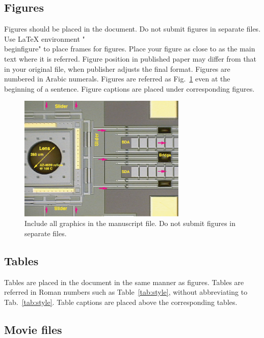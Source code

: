 \documentclass{elex}
\begin{document}
\subsection{Figures}

Figures should be placed in the document.  Do not submit figures in separate files.  Use LaTeX environment "\\begin{figure}" to place frames for figures. Place your figure as close to as the main text where it is referred.  Figure position in published paper may differ from that in your original file, when publisher adjusts the final format. Figures are numbered in Arabic numerals. Figures are referred as Fig.~\ref{fig:scanner} even at the beginning of a sentence. Figure captions are placed under corresponding figures.


\begin{figure}[htb]
\begin{center}
\includegraphics[width=8cm]{figures/lens_scanner.eps}
\end{center}
\caption{Include all graphics in the manuscript file.  Do not submit figures in
separate files.}
\label{fig:scanner}
\end{figure}



\subsection{Tables}

Tables are placed in the document in the same manner as figures.  Tables are referred in Roman numbers such as Table~\ref{tab:style}, without abbreviating to Tab.~\ref{tab:style}.  Table captions are placed above the corresponding tables.



\subsection{Movie files}
\end{document}

